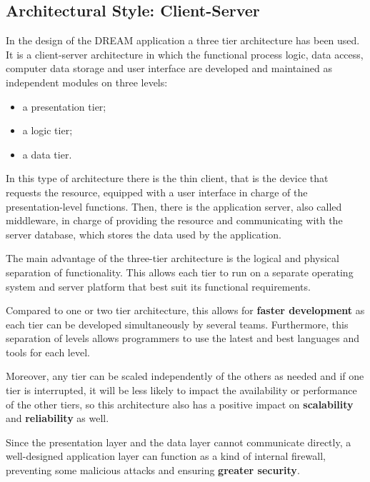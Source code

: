 
\subsection{Architectural Style: Client-Server}
In the design of the DREAM application a three tier architecture has been used. It is a client-server architecture in which the functional process logic, data access, computer data storage and user interface are developed and maintained as independent modules on three levels:
\begin{itemize}
    \item a presentation tier;
    \item a logic tier;
    \item a data tier. 
\end{itemize}

In this type of architecture there is the thin client, that is the device that requests the resource, equipped with a user interface in charge of the presentation-level functions. Then, there is the application server, also called middleware, in charge of providing the resource and communicating with the server database, which stores the data used by the application.

The main advantage of the three-tier architecture is the logical and physical separation of functionality. This allows each tier to run on a separate operating system and server platform that best suit its functional requirements.

Compared to one or two tier architecture, this allows for \textbf{faster development} as each tier can be developed simultaneously by several teams. Furthermore, this separation of levels allows programmers to use the latest and best languages and tools for each level.

Moreover, any tier can be scaled independently of the others as needed and if one tier is interrupted, it will be less likely to impact the availability or performance of the other tiers, so this architecture also has a positive impact on \textbf{scalability} and \textbf{reliability} as well.

Since the presentation layer and the data layer cannot communicate directly, a well-designed application layer can function as a kind of internal firewall, preventing some malicious attacks and ensuring \textbf{greater security}.
